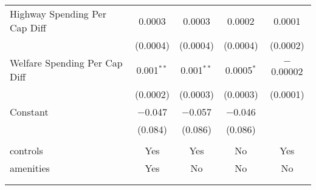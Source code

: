 \begin{table}[!htbp]
\begin{tabular}{@{\extracolsep{5pt}}lcccc}
  Highway Spending Per Cap Diff & 0.0003 & 0.0003 & 0.0002 & 0.0001 \\ 
  & (0.0004) & (0.0004) & (0.0004) & (0.0002) \\ 
  Welfare Spending Per Cap Diff & 0.001$^{**}$ & 0.001$^{**}$ & 0.0005$^{*}$ & $-$0.00002 \\ 
  & (0.0002) & (0.0003) & (0.0003) & (0.0001) \\ 
  Constant & $-$0.047 & $-$0.057 & $-$0.046 &  \\ 
  & (0.084) & (0.086) & (0.086) &  \\ 
 \hline \\[-1.8ex] 
controls & Yes & Yes & No & Yes \\ 
amenities & Yes & No & No & No \\ 
\hline \\[-1.8ex] 
\hline 
\hline \\[-1.8ex] 
\end{tabular} 
\end{table} 
